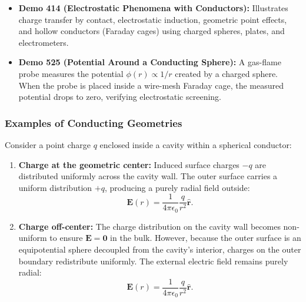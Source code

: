 \begin{remark}
    \begin{itemize}
        \item \textbf{Demo 414 (Electrostatic Phenomena with Conductors):} Illustrates charge transfer by contact, electrostatic induction, geometric point effects, and hollow conductors (Faraday cages) using charged spheres, plates, and electrometers.
        \item \textbf{Demo 525 (Potential Around a Conducting Sphere):} A gas-flame probe measures the potential \(\phi(r) \propto 1/r\) created by a charged sphere. When the probe is placed inside a wire-mesh Faraday cage, the measured potential drops to zero, verifying electrostatic screening.
    \end{itemize}
\end{remark}

\subsubsection{Examples of Conducting Geometries}

\begin{example}
    Consider a point charge \(q\) enclosed inside a cavity within a spherical conductor:
    \begin{enumerate}
        \item \textbf{Charge at the geometric center:} Induced surface charges \(-q\) are distributed uniformly across the cavity wall. The outer surface carries a uniform distribution \(+q\), producing a purely radial field outside:
        \begin{equation}
            \bm{E}(r) = \frac{1}{4\pi\epsilon_0}\frac{q}{r^2}\hat{\bm{r}}.
        \end{equation}
        \item \textbf{Charge off-center:} The charge distribution on the cavity wall becomes non-uniform to ensure \(\bm{E} = \bm{0}\) in the bulk. However, because the outer surface is an equipotential sphere decoupled from the cavity's interior, charges on the outer boundary redistribute uniformly. The external electric field remains purely radial:
        \begin{equation}
            \bm{E}(r) = \frac{1}{4\pi\epsilon_0}\frac{q}{r^2}\hat{\bm{r}}.
        \end{equation}
    \end{enumerate}
\end{example}

